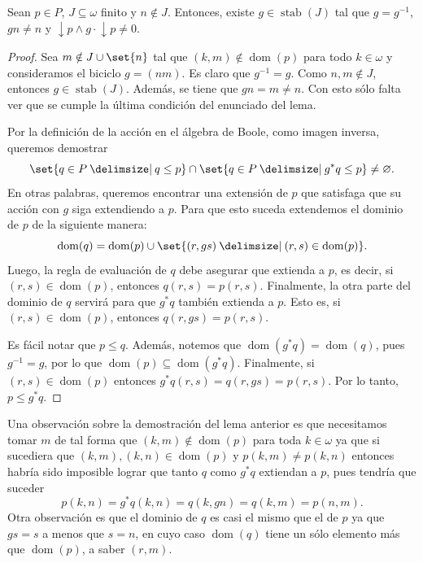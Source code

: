 \documentclass[letterpaper,DIV=15,12pt]{scrartcl}
\renewcommand{\emptyset}{\varnothing}
\DeclareMathOperator{\dom}{dom}                            %
\DeclareMathOperator{\stab}{stab}                          %
\DeclareMathOperator{\abajo}{\downarrow}                   %
\newcommand{\st}{}
\newcommand{\SetSymbol}[1][]{%
\nonscript\:#1\vert
\allowbreak
\nonscript\:
\mathopen{}}
\renewcommand\st{\SetSymbol[\delimsize]}
\begin{document}
\begin{lemma}[label=lema:tecnico]
    Sean \(p\in P\), \(J\subseteq\omega\) finito y \(n\notin J\). Entonces,
    existe \(g\in\stab(J)\) tal que \(g=g^{-1}\), \(gn\ne n\) y 
    \(\abajo p \land g\cdot\abajo p\ne 0\).
\end{lemma}
\begin{proof}
    Sea \(m\notin J\cup\set{n}\) tal que \((k,m)\notin\dom(p)\) para todo
    \(k\in\omega\) y consideramos el biciclo \(g=(nm)\). Es claro
    que \(g^{-1}=g\). Como \(n,m\notin J\), entonces \(g\in\stab(J)\). Además,
    se tiene que \(gn=m\ne n\). Con esto sólo falta ver que se cumple la última
    condición del enunciado del lema.

    Por la definición de la acción en el álgebra de Boole, como imagen inversa,
    queremos demostrar
    \begin{equation*}
        \set{q\in P\st q\leq p}\cap\set{q\in P\st g^*q\leq p}\ne\emptyset.
    \end{equation*}
    En otras palabras, queremos encontrar una extensión de \(p\) que satisfaga
    que su acción con \(g\) siga extendiendo a \(p\). Para que esto suceda
    extendemos el dominio de \(p\) de la siguiente manera:
    \begin{equation*}
        \dom(q)=\dom(p)\cup\set{(r,gs)\st (r,s)\in\dom(p)}.
    \end{equation*}
    Luego, la regla de evaluación de \(q\) debe asegurar que extienda a \(p\),
    es decir, si \((r,s)\in\dom(p)\), entonces \(q(r,s)=p(r,s)\). Finalmente, la
    otra parte del dominio de \(q\) servirá para que \(g^*q\) también extienda a
    \(p\). Esto es, si \((r,s)\in\dom(p)\), entonces \(q(r,gs)=p(r,s)\).

    Es fácil notar que \(p\leq q\). Además, notemos que \(\dom(g^*q)=\dom(q)\),
    pues \(g^{-1}=g\), por lo que \(\dom(p)\subseteq\dom(g^*q)\). Finalmente, si
    \((r,s)\in\dom(p)\) entonces \(g^*q(r,s)=q(r,gs)=p(r,s)\). Por lo tanto,
    \(p\leq g^*q\).
\end{proof}

Una observación sobre la demostración del lema anterior es que necesitamos tomar
\(m\) de tal forma que \((k,m)\notin\dom(p)\) para toda \(k\in\omega\) ya que si
sucediera que \((k,m),(k,n)\in\dom(p)\) y \(p(k,m)\ne p(k,n)\) entonces habría
sido imposible lograr que tanto \(q\) como \(g^*q\) extiendan a \(p\), pues
tendría que suceder
\begin{equation*}
    p(k,n)=g^*q(k,n)=q(k,gn)=q(k,m)=p(n,m).
\end{equation*}
Otra observación es que el dominio de \(q\) es casi el mismo que el de \(p\) ya
que \(gs=s\) a menos que \(s=n\), en cuyo caso \(\dom(q)\) tiene un sólo
elemento más que \(\dom(p)\), a saber \((r,m)\).
\end{document}
